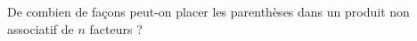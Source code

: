 De combien de façons peut-on placer les parenthèses dans un produit non associatif de $n$ facteurs ?
